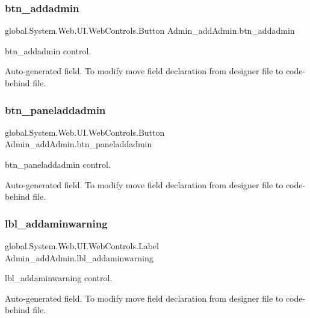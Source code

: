 \subsubsection{\texorpdfstring{btn\_addadmin}{btn\_addadmin}}
{\footnotesize\ttfamily global.\+System.\+Web.\+U\+I.\+Web\+Controls.\+Button Admin\+\_\+add\+Admin.\+btn\+\_\+addadmin\hspace{0.3cm}{\ttfamily [protected]}}



btn\+\_\+addadmin control. 

Auto-\/generated field. To modify move field declaration from designer file to code-\/behind file. \mbox{\label{class_admin__add_admin_ac099ca5be16fa9184f3cd18fb9bba26f}} 
\subsubsection{\texorpdfstring{btn\_paneladdadmin}{btn\_paneladdadmin}}
{\footnotesize\ttfamily global.\+System.\+Web.\+U\+I.\+Web\+Controls.\+Button Admin\+\_\+add\+Admin.\+btn\+\_\+paneladdadmin\hspace{0.3cm}{\ttfamily [protected]}}



btn\+\_\+paneladdadmin control. 

Auto-\/generated field. To modify move field declaration from designer file to code-\/behind file. \mbox{\label{class_admin__add_admin_a34cba1e618f49372d9263b9f84e32c3b}} 
\subsubsection{\texorpdfstring{lbl\_addaminwarning}{lbl\_addaminwarning}}
{\footnotesize\ttfamily global.\+System.\+Web.\+U\+I.\+Web\+Controls.\+Label Admin\+\_\+add\+Admin.\+lbl\+\_\+addaminwarning\hspace{0.3cm}{\ttfamily [protected]}}



lbl\+\_\+addaminwarning control. 

Auto-\/generated field. To modify move field declaration from designer file to code-\/behind file. \mbox{\label{class_admin__add_admin_adf8dd956c7551881f6908b431665e0a5}} 
